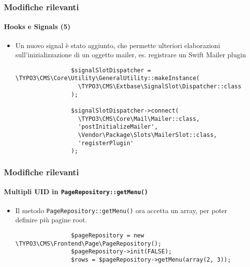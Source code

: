 \begin{frame}[fragile]
	\frametitle{Modifiche rilevanti}
	\framesubtitle{Hooks e Signals (5)}

	\lstset{basicstyle=\tiny\ttfamily}

	\begin{itemize}

		\item Un nuovo signal è stato aggiunto, che permette ulteriori elaborazioni sull'inizializzazione di un
			oggetto mailer, es. registrare un Swift Mailer plugin

			\begin{lstlisting}
				$signalSlotDispatcher = \TYPO3\CMS\Core\Utility\GeneralUtility::makeInstance(
				  \TYPO3\CMS\Extbase\SignalSlot\Dispatcher::class
				);

				$signalSlotDispatcher->connect(
				  \TYPO3\CMS\Core\Mail\Mailer::class,
				  'postInitializeMailer',
				  \Vendor\Package\Slots\MailerSlot::class,
				  'registerPlugin'
				);
		\end{lstlisting}

	\end{itemize}

\end{frame}


\begin{frame}[fragile]
	\frametitle{Modifiche rilevanti}
	\framesubtitle{Multipli UID in \texttt{PageRepository::getMenu()}}

	\begin{itemize}


		\item Il metodo \texttt{PageRepository::getMenu()} ora accetta un array, per poter
			definire più pagine root.

			\begin{lstlisting}
				$pageRepository = new \TYPO3\CMS\Frontend\Page\PageRepository();
				$pageRepository->init(FALSE);
				$rows = $pageRepository->getMenu(array(2, 3));
			\end{lstlisting}

	\end{itemize}

\end{frame}

